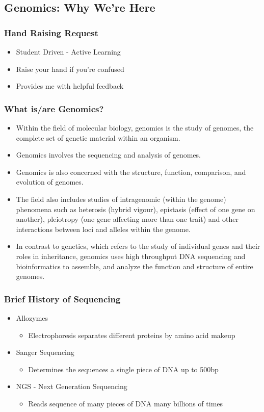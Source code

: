 \documentclass{beamer}
\begin{document}
\subsection{Genomics: Why We're Here}
\begin{frame}
\frametitle{Hand Raising Request}
\begin{itemize}
	\item<1-> Student Driven - Active Learning
	\item<2-> Raise your hand if you're confused
	\item<3-> Provides me with helpful feedback
\end{itemize}
%
\end{frame}
\begin{frame}
\frametitle{What is/are Genomics?}
\begin{itemize}
	\item<2-> Within the field of molecular biology, genomics is the study of genomes, the complete set of genetic material within an organism.
	\item<3-> Genomics involves the sequencing and analysis of genomes. 
	\item<4-> Genomics is also concerned with the structure, function, comparison, and evolution of genomes.
	\item<5-> The field also includes studies of intragenomic (within the genome) phenomena such as heterosis (hybrid vigour), epistasis (effect of one gene on another), pleiotropy (one gene affecting more than one trait) and other interactions between loci and alleles within the genome.
	\item<6-> In contrast to genetics, which refers to the study of individual genes and their roles in inheritance, genomics uses high throughput DNA sequencing and bioinformatics to assemble, and analyze the function and structure of entire genomes.
\end{itemize}
\end{frame}
\begin{frame}
\frametitle{Brief History of Sequencing}
\begin{itemize}
	\item Allozymes
	\begin{itemize}
		\item Electrophoresis separates different proteins by amino acid makeup
	\end{itemize}
	\item Sanger Sequencing
	\begin{itemize}
		\item Determines the sequences a single piece of DNA up to 500bp
	\end{itemize}
	\item NGS - Next Generation Sequencing
	\begin{itemize}
		\item Reads sequence of many pieces of DNA many billions of times
	\end{itemize}
\end{itemize}
\end{frame}
\end{document}
